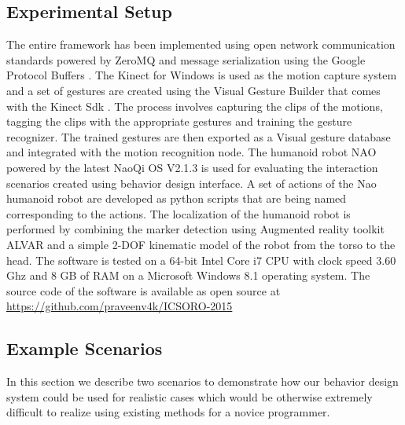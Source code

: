 \documentclass{llncs}
\begin{document}
\subsection{Experimental Setup}
The entire framework has been implemented using open network communication standards powered by ZeroMQ \cite{ZeroMQ} and message serialization using the Google Protocol Buffers \cite{ProtocolBuffers}. The Kinect for Windows is used as the motion capture system and a set of gestures are created using the Visual Gesture Builder that comes with the Kinect Sdk \cite{Kinect2014}. The process involves capturing the clips of the motions, tagging the clips with the appropriate gestures and training the gesture recognizer. The trained gestures are then exported as a Visual gesture database and integrated with the motion recognition node. The humanoid robot NAO powered by the latest NaoQi OS V2.1.3 is used for evaluating the interaction scenarios created using behavior design interface.  A set of actions of the Nao humanoid robot are developed as python scripts that are being named corresponding to the actions. The localization of the humanoid robot is performed by combining the marker detection using Augmented reality toolkit ALVAR \cite{ALVAR} and a simple 2-DOF kinematic model of the robot from the torso to the head. The software is tested on a 64-bit Intel Core i7 CPU with clock speed 3.60 Ghz and 8 GB of RAM on a  Microsoft Windows 8.1 operating system. The source code of the software is available as open source at \url{https://github.com/praveenv4k/ICSORO-2015}
\subsection{Example Scenarios}
	In this section we describe two scenarios to demonstrate how our behavior design system could be used for realistic cases which would be otherwise extremely difficult to realize using existing methods for a novice programmer.
\end{document}
